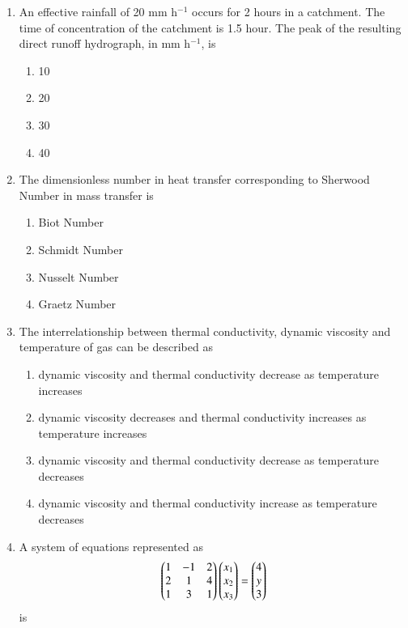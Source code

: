 \documentclass[journal]{IEEEtran}
\numberwithin{equation}{enumi}
\numberwithin{figure}{enumi}
\begin{document}
\begin{enumerate}
   

    \item An effective rainfall of 20 mm h\(^{-1}\) occurs for 2 hours in a catchment. The time of concentration of the catchment is 1.5 hour. The peak of the resulting direct runoff hydrograph, in mm h\(^{-1}\), is
    \hfill{}
    \begin{multicols}{4}
    \begin{enumerate}
    \item 10
    \item 20
    \item 30
    \item 40
    \end{enumerate}
    \end{multicols}
    


\item The dimensionless number in heat transfer corresponding to Sherwood Number in mass transfer is 
\hfill{}
    \begin{multicols}{2}
    \begin{enumerate}
    \item Biot Number
    \item Schmidt Number
    \item Nusselt Number
    \item Graetz Number
    \end{enumerate}
    \end{multicols}


    
\item The interrelationship between thermal conductivity, dynamic viscosity and temperature of gas can be described as \hfill{}
\begin{enumerate}
   
\item  dynamic viscosity and thermal conductivity decrease as temperature increases 
\item  dynamic viscosity decreases and thermal conductivity increases as temperature increases 
\item dynamic viscosity and thermal conductivity decrease as temperature decreases 
\item  dynamic viscosity and thermal conductivity increase as temperature decreases 
\end{enumerate}

    
\item A system of equations represented as
\hfill{}
\begin{align*}
\begin{pmatrix}
1 & -1 & 2 \\
2 & 1  & 4 \\
1 & 3  & 1
\end{pmatrix}
\begin{pmatrix}
x_1 \\ x_2 \\ x_3
\end{pmatrix}
=
\begin{pmatrix}
4 \\ y \\ 3
\end{pmatrix}
\end{align*}
is 


\end{enumerate}
\end{document}

